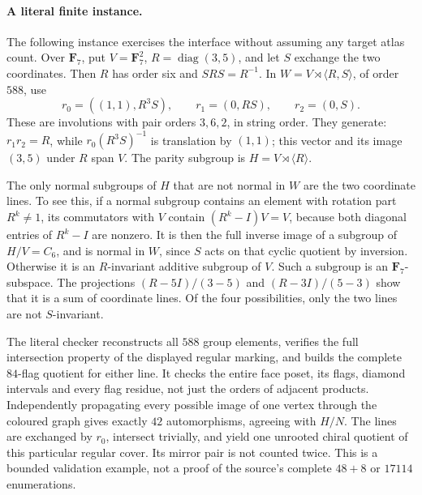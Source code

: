 \documentclass[11pt]{article}
\begin{document}
\paragraph{A literal finite instance.}
The following instance exercises the interface without assuming any
target atlas count. Over $\mathbf F_7$, put $V=\mathbf F_7^2$,
$R=\operatorname{diag}(3,5)$, and let $S$ exchange the two coordinates.
Then $R$ has order six and $SRS=R^{-1}$. In
$W=V\rtimes\langle R,S\rangle$, of order $588$, use
\[
 r_0=((1,1),R^3S),\qquad r_1=(0,RS),\qquad r_2=(0,S).
\]
These are involutions with pair orders $3,6,2$, in string order.
They generate: $r_1r_2=R$, while $r_0(R^3S)^{-1}$ is translation by
$(1,1)$; this vector and its image $(3,5)$ under $R$ span $V$.
The parity subgroup is $H=V\rtimes\langle R\rangle$.

The only normal subgroups of $H$ that are not normal in $W$ are the
two coordinate lines. To see this, if a normal subgroup contains an
element with rotation part $R^k\ne1$, its commutators with $V$ contain
$(R^k-I)V=V$, because both diagonal entries of $R^k-I$ are nonzero.
It is then the full inverse image of a subgroup of $H/V=C_6$, and is
normal in $W$, since $S$ acts on that cyclic quotient by inversion.
Otherwise it is an $R$-invariant additive subgroup of $V$. Such a
subgroup is an $\mathbf F_7$-subspace. The projections
$(R-5I)/(3-5)$ and $(R-3I)/(5-3)$ show that it is a sum of coordinate
lines. Of the four possibilities, only the two lines are not $S$-invariant.

The literal checker reconstructs all $588$ group elements, verifies the
full intersection property of the displayed regular marking, and builds
the complete $84$-flag quotient for either line. It checks the entire
face poset, its flags, diamond intervals and every flag residue, not
just the orders of adjacent products. Independently propagating every
possible image of one vertex through the coloured graph gives exactly
$42$ automorphisms, agreeing with $H/N$. The lines are exchanged by
$r_0$, intersect trivially, and yield one unrooted chiral quotient of
this particular regular cover. Its mirror pair is not counted twice.
This is a bounded validation example, not a proof of the source's
complete $48+8$ or $17114$ enumerations.
\end{document}
